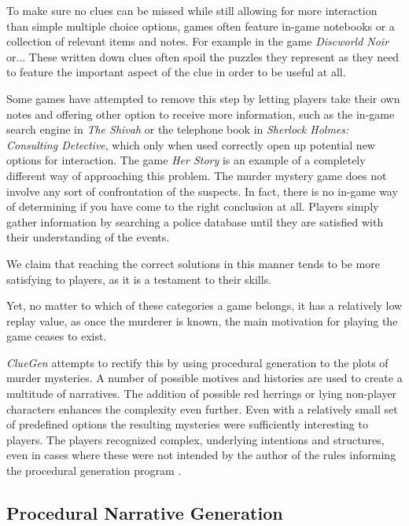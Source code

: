 To make sure no clues can be missed while still allowing for more interaction than simple multiple choice options, games often feature in-game notebooks or a collection of relevant items and notes.
For example in the game \emph{Discworld Noir} or... 
These written down clues often spoil the puzzles they represent as they need to feature the important aspect of the clue in order to be useful at all.

Some games have attempted to remove this step by letting players take their own notes and offering other option to receive more information, such as the in-game search engine in \emph{The Shivah} or the telephone book in \emph{Sherlock Holmes: Consulting Detective}, which only when used correctly open up potential new options for interaction.
The game \emph{Her Story} is an example of a completely different way of approaching this problem.
The murder mystery game does not involve any sort of confrontation of the suspects.
In fact, there is no in-game way of determining if you have come to the right conclusion at all.
Players simply gather information by searching a police database until they are satisfied with their understanding of the events.

We claim that reaching the correct solutions in this manner tends to be more satisfying to players, as it is a testament to their skills.

Yet, no matter to which of these categories a game belongs, it has a relatively low replay value, as once the murderer is known, the main motivation for playing the game ceases to exist.

\emph{ClueGen} attempts to rectify this by using procedural generation to the plots of murder mysteries.
A number of possible motives and histories are used to create a multitude of narratives.
The addition of possible red herrings or lying non-player characters enhances the complexity even further.
Even with a relatively small set of predefined options the resulting mysteries were sufficiently interesting to players.
The players recognized complex, underlying intentions and structures, even in cases where these were not intended by the author of the rules informing the procedural generation program \cite{stockdale_2016}.

\subsection{Procedural Narrative Generation}

